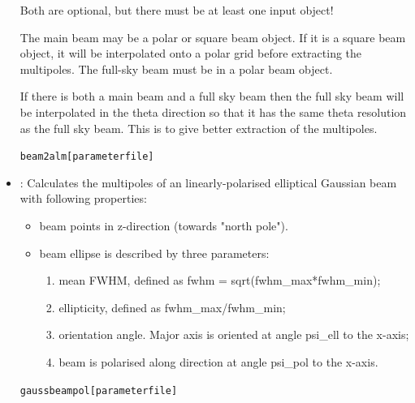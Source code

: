 \begin{itemize}
Both are optional, but there must be at least one input object!

The main beam may be a polar or square beam object. If it is a square
beam object, it will be interpolated onto a polar grid before
extracting the multipoles. The full-sky beam must be in a polar beam
object.

If there is both a main beam and a full sky beam then the full sky
beam will be interpolated in the theta direction so that it has the
same theta resolution as the full sky beam. This is to give better
extraction of the multipoles.

\begin{alltt}
beam2alm [parameter file]


\end{alltt}

\item {}:
Calculates the multipoles of an linearly-polarised elliptical Gaussian
beam with following properties:

\begin{itemize}
  \item beam points in z-direction (towards "north pole").

  \item beam ellipse is described by three parameters:
  \begin{enumerate}
    \item mean FWHM, defined as fwhm = sqrt(fwhm\_max*fwhm\_min);
    \item ellipticity, defined as fwhm\_max/fwhm\_min;
    \item orientation angle. Major axis is oriented at angle psi\_ell to
          the x-axis;
    \item beam is polarised along direction at angle psi\_pol to the
          x-axis.
  \end{enumerate}
\end{itemize}

\begin{alltt}
gaussbeampol [parameter file]


\end{alltt}

\end{itemize}

